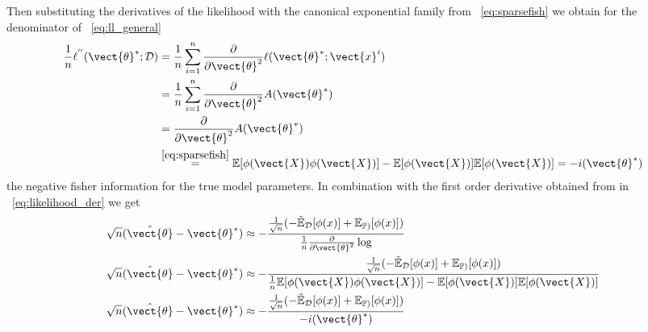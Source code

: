       Then substituting the derivatives of the likelihood with the canonical exponential family from \eq~\ref{eq:sparsefish} we obtain for the denominator of \eq~\ref{eq:ll_general}
      \begin{equation}
        \begin{split}
        \frac{1}{n}\ell^{''}(\vect{\theta}^*; \mathcal{D}) &= \frac{1}{n} \sum_{i=1}^n \frac{\partial}{\partial \vect{\theta}^2} \ell (\vect{\theta}^*; \vect{x}^i)\\
        &= \frac{1}{n} \sum_{i=1}^n \frac{\partial}{\partial \vect{\theta}^2} A(\vect{\theta}^*)\\
        & = \frac{\partial}{\partial \vect{\theta}^2}  A(\vect{\theta}^*)  \\
        &\stackrel{\ref{eq:sparsefish}}{=} \mathbb{E}[\phi(\vect{X}) \phi(\vect{X})] - \mathbb{E}[\phi(\vect{X})] \mathbb{E}[\phi(\vect{X})] = - i(\vect{\theta}^*)
        \end{split}
      \end{equation}
      the negative fisher information for the true model parameters.
      In combination with the first order derivative obtained from in \eq~\ref{eq:likelihood_der} we get 
      \begin{equation}
        \label{eq:asympnorm}
          \begin{split}
            \sqrt{n}(\hat{\vect{\theta}} - \vect{\theta}^*)  &\approx - \frac{\frac{1}{\sqrt{n}}( -\tilde{\mathbb{E}}_{\mathcal{D}}[\phi(x)] + \mathbb{E}_{\mathbb{P})}[\phi(x)])}{\frac{1}{n} \frac{\partial}{\partial \vect{\theta}^2} \log } \\
            \sqrt{n}(\hat{\vect{\theta}} - \vect{\theta}^*)  &\approx - \frac{\frac{1}{\sqrt{n}}( -\tilde{\mathbb{E}}_{\mathcal{D}}[\phi(x)] + \mathbb{E}_{\mathbb{P})}[\phi(x)])}{\frac{1}{n} \mathbb{E}[\phi(\vect{X}) \phi(\vect{X})] - \mathbb{E}[\phi(\vect{X})] \mathbb{E}[\phi(\vect{X})]} \\
            \sqrt{n}(\hat{\vect{\theta}} - \vect{\theta}^*)   &\approx - \frac{\frac{1}{\sqrt{n}}( -\tilde{\mathbb{E}}_{\mathcal{D}}[\phi(x)] + \mathbb{E}_{\mathbb{P})}[\phi(x)])}{- i(\vect{\theta}^*)} 
          \end{split}
      \end{equation}

